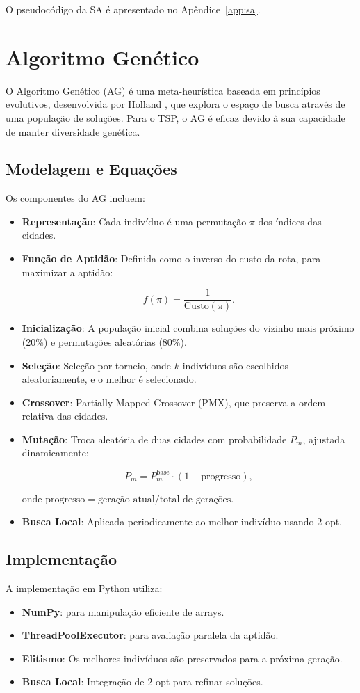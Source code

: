 \documentclass[12pt]{article}
\begin{document}
O pseudocódigo da SA é apresentado no Apêndice~\ref{app:sa}.

\section{Algoritmo Genético}
O Algoritmo Genético (AG) é uma meta-heurística baseada em princípios evolutivos, desenvolvida por Holland \cite{holland1992}, que explora o espaço de busca através de uma população de soluções. Para o TSP, o AG é eficaz devido à sua capacidade de manter diversidade genética.

\subsection{Modelagem e Equações}
Os componentes do AG incluem:
\begin{itemize}
    \item \textbf{Representação}: Cada indivíduo é uma permutação \(\pi\) dos índices das cidades.
    \item \textbf{Função de Aptidão}: Definida como o inverso do custo da rota, para maximizar a aptidão:

        \[
        f(\pi) = \frac{1}{\text{Custo}(\pi)}.
        \]
    
    \item \textbf{Inicialização}: A população inicial combina soluções do vizinho mais próximo (20\%) e permutações aleatórias (80\%).
    \item \textbf{Seleção}: Seleção por torneio, onde \(k\) indivíduos são escolhidos aleatoriamente, e o melhor é selecionado.
    \item \textbf{Crossover}: Partially Mapped Crossover (PMX), que preserva a ordem relativa das cidades.
    \item \textbf{Mutação}: Troca aleatória de duas cidades com probabilidade \(P_m\), ajustada dinamicamente:

        \[
        P_m = P_m^{\text{base}} \cdot (1 + \text{progresso}),
        \]

        onde \(\text{progresso} = \text{geração atual} / \text{total de gerações}\).
    \item \textbf{Busca Local}: Aplicada periodicamente ao melhor indivíduo usando 2-opt.
\end{itemize}

\subsection{Implementação}
A implementação em Python utiliza:
\begin{itemize}
    \item \textbf{NumPy}: para manipulação eficiente de arrays.
    \item \textbf{ThreadPoolExecutor}: para avaliação paralela da aptidão.
    \item \textbf{Elitismo}: Os melhores indivíduos são preservados para a próxima geração.
    \item \textbf{Busca Local}: Integração de 2-opt para refinar soluções.
\end{itemize}
\end{document}
